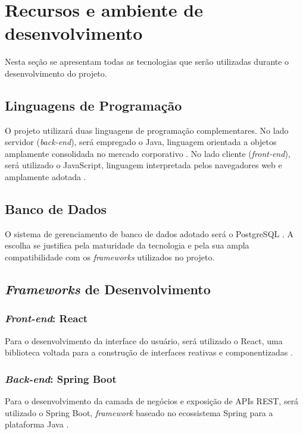 \chapter{Recursos e ambiente de desenvolvimento}\label{sec:5}

Nesta seção se apresentam todas as tecnologias que serão utilizadas durante o desenvolvimento do projeto.

\section{Linguagens de Programação}

O projeto utilizará duas linguagens de programação complementares. No lado 
servidor (\textit{back-end}), será empregado o Java, linguagem 
orientada a objetos amplamente consolidada no mercado corporativo \cite{Oracle2025}. No lado 
cliente (\textit{front-end}), será utilizado o JavaScript, linguagem 
interpretada pelos navegadores web e amplamente adotada \cite{Guo2025}.

\section{Banco de Dados}

O sistema de gerenciamento de banco de dados adotado será o 
PostgreSQL \cite{PostgreSQLGlobalDevelopmentGroup2025}. A escolha se justifica pela maturidade da tecnologia e pela sua 
ampla compatibilidade com os \textit{frameworks} utilizados no projeto.

\section{\textit{Frameworks} de Desenvolvimento}

\subsection{\textit{Front-end}: React}

Para o desenvolvimento da interface do usuário, será utilizado o 
React, uma biblioteca voltada para a construção de interfaces reativas e componentizadas \cite{ReactTeam2025}. 

\subsection{\textit{Back-end}: Spring Boot}

Para o desenvolvimento da camada de negócios e exposição de APIs REST, será 
utilizado o Spring Boot, \textit{framework} baseado no ecossistema 
Spring para a plataforma Java \cite{Webb2025}.